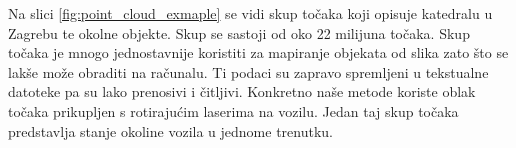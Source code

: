 Na slici \ref{fig:point_cloud_exmaple} se vidi skup točaka koji opisuje katedralu u Zagrebu te okolne objekte. Skup se sastoji od oko 22 milijuna točaka. Skup točaka je mnogo jednostavnije koristiti za mapiranje objekata od slika zato što se lakše može obraditi na računalu. Ti podaci su zapravo spremljeni u tekstualne datoteke pa su lako prenosivi i čitljivi. Konkretno naše metode koriste oblak točaka prikupljen s rotirajućim laserima na vozilu. Jedan taj skup točaka predstavlja stanje okoline vozila u jednome trenutku.